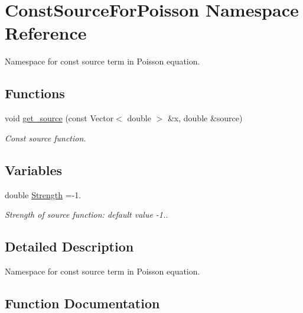 \hypertarget{namespaceConstSourceForPoisson}{}\section{Const\+Source\+For\+Poisson Namespace Reference}
\label{namespaceConstSourceForPoisson}


Namespace for const source term in Poisson equation.  


\subsection*{Functions}
\begin{DoxyCompactItemize}
\item 
void \hyperlink{namespaceConstSourceForPoisson_a40ef79083874b58ed42b4df2ca0f4c10}{get\+\_\+source} (const Vector$<$ double $>$ \&x, double \&source)
\begin{DoxyCompactList}\small\item\em Const source function. \end{DoxyCompactList}\end{DoxyCompactItemize}
\subsection*{Variables}
\begin{DoxyCompactItemize}
\item 
double \hyperlink{namespaceConstSourceForPoisson_add351c5acab2561d68d1fc9ec3d5fc5e}{Strength} =-\/1.
\begin{DoxyCompactList}\small\item\em Strength of source function\+: default value -\/1.. \end{DoxyCompactList}\end{DoxyCompactItemize}


\subsection{Detailed Description}
Namespace for const source term in Poisson equation. 

\subsection{Function Documentation}
\mbox{\label{namespaceConstSourceForPoisson_a40ef79083874b58ed42b4df2ca0f4c10}} 
